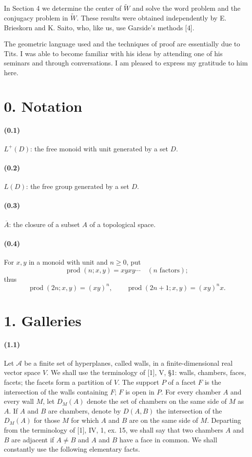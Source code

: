 \documentclass[10pt]{article}
\newcommand{\prodalt}{\operatorname{prod}}
\newcommand{\cl}[1]{\overline{#1}}
\newcommand{\mcA}{\mathcal A}
\begin{document}
In Section 4 we determine the center of $\widetilde W$ and solve the word problem and the conjugacy problem in $\widetilde W$. These results were obtained independently by E. Brieskorn and K. Saito, who, like us, use Garside's methods [4].

The geometric language used and the techniques of proof are essentially due to Tits. I was able to become familiar with his ideas by attending one of his seminars and through conversations. I am pleased to express my gratitude to him here.

\section*{0. Notation}

\paragraph{(0.1)} $L^+(D)$: the free monoid with unit generated by a set $D$.

\paragraph{(0.2)} $L(D)$: the free group generated by a set $D$.

\paragraph{(0.3)} $\cl A$: the closure of a subset $A$ of a topological space.

\paragraph{(0.4)} For $x,y$ in a monoid with unit and $n\ge0$, put
\[
\prodalt(n;x,y)=xyxy\cdots\quad (n\text{ factors});
\]
thus
\[
\prodalt(2n;x,y)=(xy)^n,\qquad
\prodalt(2n+1;x,y)=(xy)^nx.
\]

\section*{1. Galleries}

\paragraph{(1.1)} Let $\mcA$ be a finite set of hyperplanes, called walls, in a finite-dimensional real vector space $V$. We shall use the terminology of [1], V, §1: walls, chambers, faces, facets; the facets form a partition of $V$. The support $P$ of a facet $F$ is the intersection of the walls containing $F$; $F$ is open in $P$. For every chamber $A$ and every wall $M$, let $D_M(A)$ denote the set of chambers on the same side of $M$ as $A$. If $A$ and $B$ are chambers, denote by $D(A,B)$ the intersection of the $D_M(A)$ for those $M$ for which $A$ and $B$ are on the same side of $M$. Departing from the terminology of [1], IV, 1, ex. 15, we shall say that two chambers $A$ and $B$ are adjacent if $A\ne B$ and $A$ and $B$ have a face in common. We shall constantly use the following elementary facts.
\end{document}
